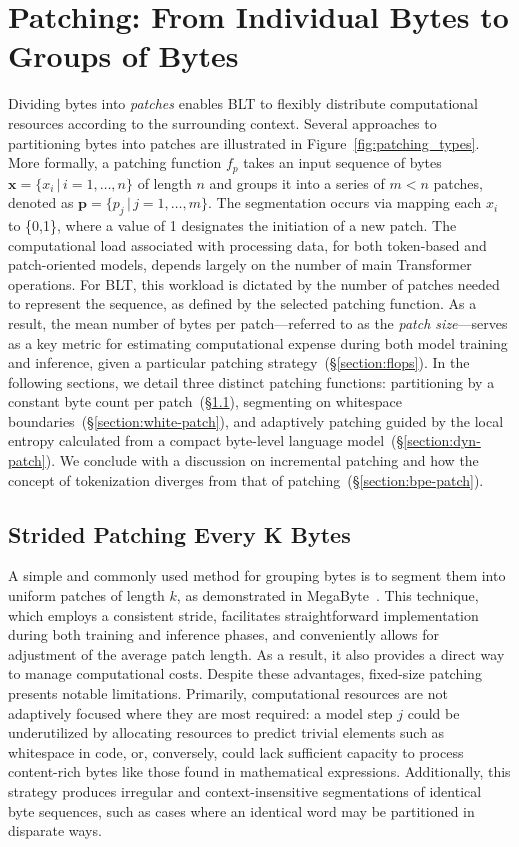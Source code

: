 \section{Patching: From Individual Bytes to Groups of Bytes}
\label{section:patching}

Dividing bytes into \textit{patches} enables {\textsc BLT} to flexibly distribute computational resources according to the surrounding context. Several approaches to partitioning bytes into patches are illustrated in Figure~\ref{fig:patching_types}. More formally, a patching function $f_p$ takes an input sequence of bytes $\pmb{x}=\{x_i\,|\,i=1,\ldots, n\}$ of length $n$ and groups it into a series of $m < n$ patches, denoted as $\pmb{p}=\{p_j\,|\,j=1,\ldots,m\}$. The segmentation occurs via mapping each $x_i$ to \{0,1\}, where a value of 1 designates the initiation of a new patch. The computational load associated with processing data, for both token-based and patch-oriented models, depends largely on the number of main Transformer operations. For {\textsc BLT}, this workload is dictated by the number of patches needed to represent the sequence, as defined by the selected patching function. As a result, the mean number of bytes per patch—referred to as the \textit{patch size}—serves as a key metric for estimating computational expense during both model training and inference, given a particular patching strategy~(\S\ref{section:flops}). In the following sections, we detail three distinct patching functions: partitioning by a constant byte count per patch~(\S\ref{section:static-patch}), segmenting on whitespace boundaries~(\S\ref{section:white-patch}), and adaptively patching guided by the local entropy calculated from a compact byte-level language model~(\S\ref{section:dyn-patch}). We conclude with a discussion on incremental patching and how the concept of tokenization diverges from that of patching~(\S\ref{section:bpe-patch}).

\subsection{Strided Patching Every K Bytes}
\label{section:static-patch}

A simple and commonly used method for grouping bytes is to segment them into uniform patches of length $k$, as demonstrated in MegaByte~\citep{yu2023megabyte}. This technique, which employs a consistent stride, facilitates straightforward implementation during both training and inference phases, and conveniently allows for adjustment of the average patch length. As a result, it also provides a direct way to manage computational costs. Despite these advantages, fixed-size patching presents notable limitations. Primarily, computational resources are not adaptively focused where they are most required: a model step $j$ could be underutilized by allocating resources to predict trivial elements such as whitespace in code, or, conversely, could lack sufficient capacity to process content-rich bytes like those found in mathematical expressions. Additionally, this strategy produces irregular and context-insensitive segmentations of identical byte sequences, such as cases where an identical word may be partitioned in disparate ways.

